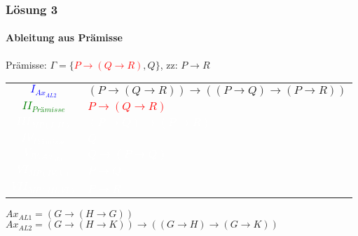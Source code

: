 \begin{frame}
	\frametitle{Lösung 3}
	\framesubtitle{Ableitung aus Prämisse}
	Prämisse: $\Gamma =\{$\textcolor{red}{$P\rightarrow(Q\rightarrow R)$}$, Q\}$, zz: $P\rightarrow R$\\
	\begin{tabular}{cl}
		\textcolor{blue}{$I_{Ax_{AL2}}$}            & $(P\rightarrow(Q\rightarrow R))\rightarrow((P\rightarrow Q)\rightarrow(P\rightarrow R))$ \\
		\textcolor{green}{$II_{\textit{Prämisse}}$} & \textcolor{red}{$P\rightarrow(Q\rightarrow R)$}                                          \\
		\textcolor{white}{$III_{MP(I, II)}$}        & \textcolor{white}{$(P\rightarrow Q)\rightarrow(P\rightarrow R)$}                         \\
		\textcolor{white}{$IV_{\textit{Prämisse}}$} & \textcolor{white}{$Q$}                                                                   \\
		\textcolor{white}{$V_{IV, Ax_{AL1}}$}       & \textcolor{white}{$Q\rightarrow(P\rightarrow Q)$}                                        \\
		\textcolor{white}{$VI_{MP(IV, V)}$}         & \textcolor{white}{$P\rightarrow Q$}                                                      \\
		\textcolor{white}{$VII_{MP(III, VI)}$}      & \textcolor{white}{$P\rightarrow R$}                                                      \\
	\end{tabular}
	$Ax_{AL1} = (G\rightarrow(H\rightarrow G))$\\
	$Ax_{AL2} = (G\rightarrow(H\rightarrow K))\rightarrow((G\rightarrow H)\rightarrow(G\rightarrow K))$\\
\end{frame}

